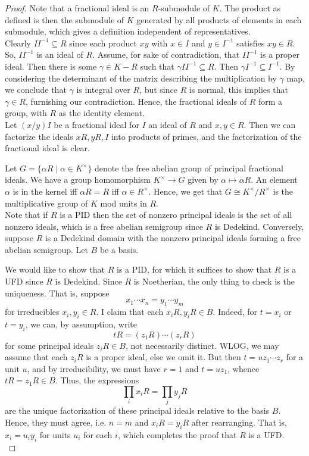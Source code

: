 \begin{proof}
	Note that a fractional ideal is an $R$-submodule of $K$. The product as defined is then the submodule of $K$ generated by all products of elements in each submodule, which gives a definition independent of representatives. \\
	
	Clearly $II^{-1} \subseteq R$ since each product $xy$ with $x \in I$ and $y \in I^{-1}$ satisfies $xy \in R$. So, $II^{-1}$ is an ideal of $R$. Assume, for sake of contradiction, that $II^{-1}$ is a proper ideal. Then there is some $\gamma \in K-R$ such that $\gamma II^{-1} \subseteq R$. Then $\gamma I^{-1} \subseteq I^{-1}$. By considering the determinant of the matrix describing the multiplication by $\gamma$ map, we conclude that $\gamma$ is integral over $R$, but since $R$ is normal, this implies that $\gamma \in R$, furnishing our contradiction. Hence, the fractional ideals of $R$ form a group, with $R$ as the identity element. \\
	
	Let $(x/y) I$ be a fractional ideal for $I$ an ideal of $R$ and $x,y \in R$. Then we can factorize the ideals $xR,yR,I$ into products of primes, and the factorization of the fractional ideal is clear.
	
	Let $G = \{ \alpha R \mid \alpha \in K^\times \}$ denote the free abelian group of principal fractional ideals. We have a group homomorphism $K^\times \to G$ given by $\alpha \mapsto \alpha R$. An element $\alpha$ is in the kernel iff $\alpha R = R$ iff $\alpha \in R^\times$. Hence, we get that $G \cong K^\times/R^\times$ is the multiplicative group of $K$ mod units in $R$. \\
	
	Note that if $R$ is a PID then the set of nonzero principal ideals is the set of all nonzero ideals, which is a free abelian semigroup since $R$ is Dedekind. Conversely, suppose $R$ is a Dedekind domain with the nonzero principal ideals forming a free abelian semigroup. Let $B$ be a basis.

	We would like to show that $R$ is a PID, for which it suffices to show that $R$ is a UFD since $R$ is Dedekind. Since $R$ is Noetherian, the only thing to check is the uniqueness. That is, suppose
	\[ x_1 \cdots x_n = y_1 \cdots y_m \]
	for irreducibles $x_i,y_i \in R$. I claim that each $x_iR,y_iR \in B$. Indeed, for $t=x_i$ or $t=y_i$, we can, by assumption, write
	\[ tR = (z_1R) \cdots (z_rR) \]
	for some principal ideals $z_iR \in B$, not necessarily distinct. WLOG, we may assume that each $z_iR$ is a proper ideal, else we omit it. But then $t = uz_1 \cdots z_r$ for a unit $u$, and by irreducibility, we must have $r=1$ and $t = uz_1$, whence $tR = z_1R \in B$. Thus, the expressions
	\[ \prod_i x_iR = \prod_j y_jR \]
	are the unique factorization of these principal ideals relative to the basis $B$. Hence, they must agree, i.e. $n=m$ and $x_iR = y_iR$ after rearranging. That is, $x_i = u_iy_i$ for units $u_i$ for each $i$, which completes the proof that $R$ is a UFD. \\
	

\end{proof}

